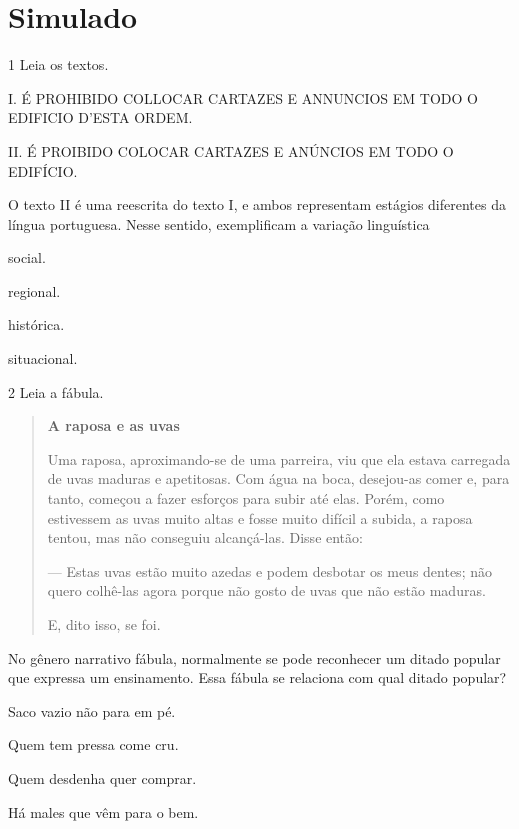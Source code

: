 
\chapter[Simulado 3]{Simulado}

\num{1} Leia os textos.

I. É PROHIBIDO COLLOCAR CARTAZES E ANNUNCIOS EM TODO O EDIFICIO D'ESTA ORDEM.

II. É PROIBIDO COLOCAR CARTAZES E ANÚNCIOS EM TODO O EDIFÍCIO.

O texto II é uma reescrita do texto I, e ambos representam estágios
diferentes da língua portuguesa. Nesse sentido, exemplificam a variação
linguística

\begin{escolha}
\item
  social.
\item
  regional.
\item
  histórica.
\item
  situacional.
\end{escolha}

\num{2} Leia a fábula.

\begin{quote}
\textbf{A raposa e as uvas}

Uma raposa, aproximando-se de uma parreira, viu que ela estava carregada
de uvas maduras e apetitosas. Com água na boca, desejou-as comer e, para
tanto, começou a fazer esforços para subir até elas. Porém, como
estivessem as uvas muito altas e fosse muito difícil a subida, a raposa
tentou, mas não conseguiu alcançá-las. Disse então:

--- Estas uvas estão muito azedas e podem desbotar os meus dentes; não
quero colhê-las agora porque não gosto de uvas que não estão maduras.

E, dito isso, se foi.

\end{quote}

No gênero narrativo fábula, normalmente se pode reconhecer um ditado
popular que expressa um ensinamento. Essa fábula se relaciona com qual ditado popular?

\begin{escolha}
\item Saco vazio não para em pé.

\item Quem tem pressa come cru.

\item Quem desdenha quer comprar.

\item Há males que vêm para o bem.
\end{escolha}

